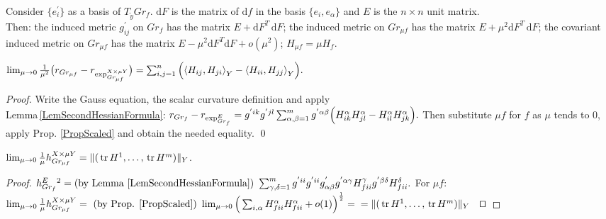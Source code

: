 \documentclass{llncs}
\newcommand{\Diff}{\mathrm{d}}
\newcommand {\tr}{{\,}\mathrm{tr}{\,}}
\begin{document}
\begin{proposition} \label{PropScaled}
Consider $\{ e_i^{'} \}$ as a basis of $T_{\tilde{y}}Gr_f$. 
$\Diff F$ is the matrix of $\Diff f$ in the basis $\{ e_i, e_{\alpha} \}$ and $E$ is the $n\times n$ unit matrix.
\\
Then:
the induced metric $g^{'}_{ij}$ on $Gr_f$ has the matrix $E + \Diff F^{T} \, \Diff F $;
the induced metric on $Gr_{\mu f}$ has the matrix $E + \mu^{2} \Diff F^{T} \, \Diff F$;
the covariant induced metric on $Gr_{\mu f}$ has the matrix $E - \mu^{2} \Diff F^{T} \Diff F + o(\mu ^ {2})$;
$H_{\mu f} = \mu H_f.$
\end{proposition}

\begin{lemma} \label{LemScalar}
$
\lim_{\mu\to 0} \frac{1}{{\mu}^2} \big( r_{Gr_{\mu f}} - r_{\tensor*{\exp}{^{X\times\mu Y}_ {Gr_{\mu f}} }} \big)
= \sum_{i,j=1}^{n} \Big( \langle H_{ij},H_{ji}{\rangle}_Y - \langle H_{ii},H_{jj}{\rangle}_Y \Big).
$
\end{lemma}

\begin{proof}
Write the Gauss equation, the scalar curvature definition and apply 
\\
Lemma\,\ref{LemSecondHessianFormula}: 
$r_{Gr_f} - r_{\tensor*{\exp}{^E_{Gr_{f}}}} = 
\tensor*{g}{^{'}^i^k}\tensor*{g}{^{'}^j^l}
\sum_{\alpha, \beta =1}^{m} g^{' \alpha \beta} 
\Big(\tensor*{H}{^{\alpha}_{ik}} \tensor*{H}{^{\alpha}_{jl}} - 
\tensor*{H}{^{\alpha}_{il}} \tensor*{H}{^{\alpha}_{jk}} \Big).$
Then substitute 
$\mu f$ for $f$ as $\mu$ tends to 0, apply Prop. \ref{PropScaled} and obtain the needed equality. \textrm{\qed}
\end{proof}

\begin{lemma} \label{LemMean}
$\lim_{\mu\to 0}\frac{1}{\mu} \tensor*{h}{^{X\times\mu Y}_{Gr_{\mu f}}} = \| (\tr H^1,\dots,\tr H^m )\|_Y$.
\end{lemma}

\begin{proof}
$ 
\tensor*{h}{^E_{Gr_f}} ^2 = \textrm{(by Lemma \ref{LemSecondHessianFormula}) }
\sum_{\gamma, \delta = 1}^{m} g^{'ii} g^{'ii} g^{'}_{\alpha \beta} g^{'\alpha\gamma} \tensor*{H}{_f^\gamma _i_i} g^{'\beta\delta} \tensor*{H}{_f^\delta _i_i}  .
$
For $\mu f$:
\\ 
$\lim_{\mu\to 0}\frac{1}{\mu} \tensor*{h}{^{X\times\mu Y}_{Gr_{\mu f}}} 
=\textrm{ (by Prop. \ref{PropScaled}) }
\lim_{\mu\to 0} \Big(\sum_{i, \alpha} \tensor*{H}{_f^\alpha _i_i} \tensor*{H}{_f^\alpha _i_i} + o(1) \Big)^{\frac{1}{2}} =
\\
= \| (\tr H^1,\dots,\tr H^m )\|_Y
\textrm{\qed}
$
\end{proof}
\end{document}
